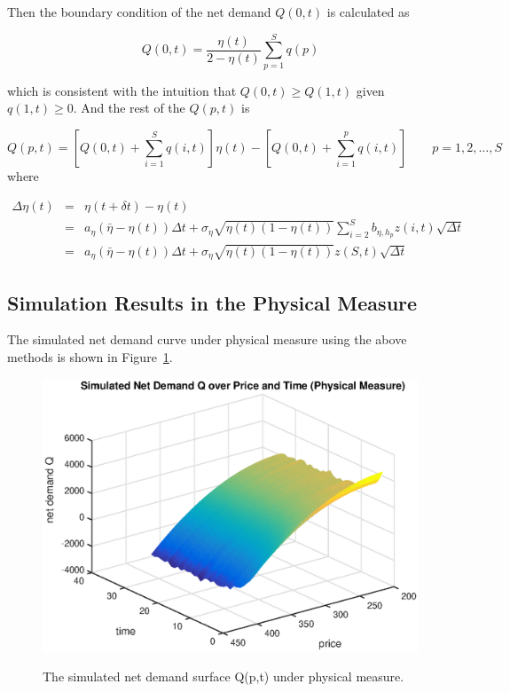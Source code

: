 \documentclass{article}
\begin{document}
Then the boundary condition of the net demand $Q(0,t)$ is calculated as

$$
Q(0,t) = \frac{\eta(t)}{2-\eta(t)} \sum_{p=1}^{S} q(p)
$$

which is consistent with the intuition that $Q(0,t) \geq Q(1,t)$ given $q(1,t)\geq 0$. And the rest of the $Q(p,t)$ is

$$
Q(p,t) = [Q(0,t) + \sum_{i=1}^{S}q(i,t)]\eta(t) - [Q(0,t) + \sum_{i=1}^{p}q(i,t)]  \qquad p = 1, 2, \ldots, S
$$
where

\begin{eqnarray*}
\Delta \eta(t) &=& \eta(t+\delta t) - \eta(t) \\
         &=& a_{\eta}(\bar{\eta} - \eta(t)) \Delta t + \sigma_{\eta} \sqrt{\eta(t)(1-\eta(t))}  \sum_{i=2}^{S} b_{\eta,h_p} z(i,t) \sqrt{\Delta t } \\
         &=& a_{\eta}(\bar{\eta} - \eta(t))\Delta t + \sigma_{\eta} \sqrt{\eta(t)(1-\eta(t))} z(S,t) \sqrt{\Delta t }
\end{eqnarray*}

\subsection{Simulation Results in the Physical Measure}
The simulated net demand curve under physical measure using the above methods is shown in Figure~\ref{fig::AAPL_20110401_simulated_Q_physical_measure}.

\begin{center}
\begin{figure}
  \centering
  \includegraphics[scale = 0.5]{Simulated_Q_Physical_Measure.eps}\\
  \caption{The simulated net demand surface Q(p,t) under physical measure.}\label{fig::AAPL_20110401_simulated_Q_physical_measure}
\end{figure}
\end{center}
\end{document}
